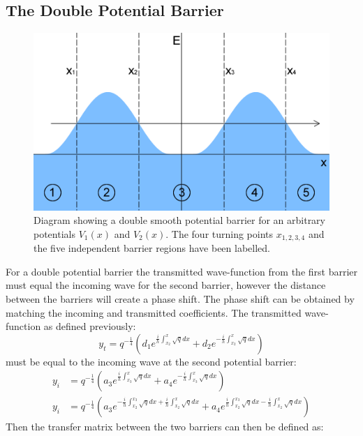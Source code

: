 		\subsection{The Double Potential Barrier}
		\begin{figure}[h]
			\centerline{\includegraphics[scale=0.6]{images/s-wkb-double-flat}}
			\caption{Diagram showing a double smooth potential barrier for an arbitrary potentials $V_{1}\left(x\right)$ and $V_{2}\left(x\right)$. The four turning points $x_{1,2,3,4}$ and the five independent barrier regions have been labelled.}
			\label{s-wkb-double-flat}
		\end{figure}
		For a double potential barrier the transmitted wave-function from the first barrier must equal the incoming wave for the second barrier, however the distance between the barriers will create a phase shift. The phase shift can be obtained by matching the incoming and transmitted coefficients. The transmitted wave-function as defined previously:
		\begin{equation}
			y_{t}= q^{-\frac{1}{4}}\left(d_{1}e^{\frac{i}{h}\int_{x_{2}}^{x}\sqrt{q}dx}+d_{2}e^{-\frac{i}{h}\int_{x_{2}}^x \sqrt{q}dx}\right)
		\end{equation}
		must be equal to the incoming wave at the second potential barrier:
		\begin{align}
			y_{i}&= q^{-\frac{1}{4}}\left(a_{3}e^{\frac{i}{h}\int_{x_{3}}^{x}\sqrt{q}dx}+a_{4}e^{-\frac{i}{h}\int_{x_{3}}^x \sqrt{q} dx}\right)\\
			y_{i}&=q^{-\frac{1}{4}}\left(a_{3}e^{-\frac{i}{h}\int_{x_{2}}^{x_{3}}\sqrt{q}dx+\frac{i}{h}\int_{x_{2}}^{x}\sqrt{q}dx}+a_{4}e^{\frac{i}{h}\int_{x_{2}}^{x_{3}}\sqrt{q}dx-\frac{i}{h}\int_{x_{2}}^{x}\sqrt{q}dx}\right)
		\end{align}
		Then the transfer matrix between the two barriers can then be defined as:
